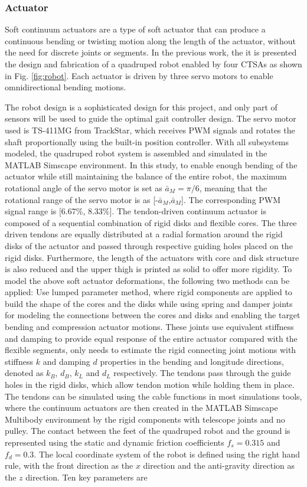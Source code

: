 \subsubsection{Actuator}
Soft continuum actuators are a type of soft actuator that can produce a continuous bending or twisting motion along the length of the actuator, without the need for discrete joints or segments. In the previous work\cite{muralidharanSoftQuadrupedRobot2021}, the it is presented the design and fabrication of a quadruped robot enabled by four CTSAs as shown in Fig. \ref{fig:robot}. Each actuator is driven by three servo motors to enable omnidirectional bending motions.

The robot design is a sophisticated design for this project, and only part of sensors will be used to guide the optimal gait controller design. The servo motor used is TS-411MG from TrackStar, which receives \ac{PWM} signals and rotates the shaft proportionally using the built-in position controller.  With all subsystems modeled, the quadruped robot system is assembled and simulated in the MATLAB Simscape environment. In this study, to enable enough bending of the actuator while still maintaining the balance of the entire robot, the maximum rotational angle of the servo motor is set as $\bar{a}_M = \pi/6$, meaning that the rotational range of the servo motor is as [-$\bar{a}_M$,$\bar{a}_M$]. The corresponding \ac{PWM} signal range is [6.67\%, 8.33\%]. The tendon-driven continuum actuator is composed of a sequential combination of rigid disks and flexible cores. The three driven tendons are equally distributed at a radial formation around the rigid disks of the actuator and passed through respective guiding holes placed on the rigid disks. Furthermore, the length of the actuators with core and disk structure is also reduced and the upper thigh is printed as solid to offer more rigidity. To model the above soft actuator deformations, the following two methods can be applied: Use lumped parameter method, where rigid components are applied to build the shape of the cores and the disks while using spring and damper joints for modeling the connections between the cores and disks and enabling the target bending and compression actuator motions. These joints use equivalent stiffness and damping to provide equal response of the entire actuator compared with the flexible segments, only needs to estimate the rigid connecting joint motions with stiffness $k$ and damping $d$ properties in the bending and longitude directions, denoted as $k_B$, $d_B$, $k_L$ and $d_L$ respectively. The tendons pass through the guide holes in the rigid disks, which allow tendon motion while holding them in place. The tendons can be simulated using the cable functions in most simulations tools, where the continuum actuators are then created in the MATLAB Simscape Multibody environment by the rigid components with telescope joints and no pulley. The contact between the feet of the quadruped robot and the ground is represented using the static and dynamic friction coefficients $f_s=0.315$ and $f_d=0.3$. The local coordinate system of the robot is defined using the right hand rule, with the front direction as the $x$ direction and the anti-gravity direction as the $z$ direction. Ten key parameters are 